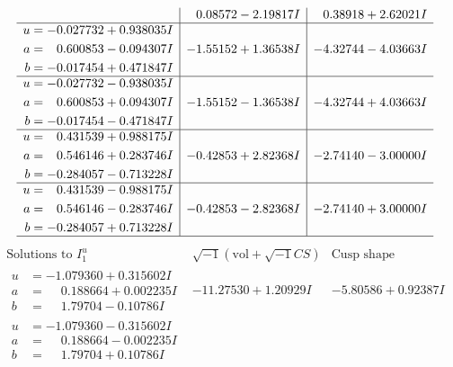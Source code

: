 \documentclass[1p]{elsarticle_modified}
\theoremstyle{definition}
\newcommand{\I}{\sqrt{-1}}
\begin{document}
$$\begin{array}{c|c|c}
 & \phantom{-}0.08572 - 2.19817 I & \phantom{-}0.38918 + 2.62021 I \\ \hline\begin{aligned}
u &= -0.027732 + 0.938035 I \\
a &= \phantom{-}0.600853 - 0.094307 I \\
b &= -0.017454 + 0.471847 I\end{aligned}
 & -1.55152 + 1.36538 I & -4.32744 - 4.03663 I \\ \hline\begin{aligned}
u &= -0.027732 - 0.938035 I \\
a &= \phantom{-}0.600853 + 0.094307 I \\
b &= -0.017454 - 0.471847 I\end{aligned}
 & -1.55152 - 1.36538 I & -4.32744 + 4.03663 I \\ \hline\begin{aligned}
u &= \phantom{-}0.431539 + 0.988175 I \\
a &= \phantom{-}0.546146 + 0.283746 I \\
b &= -0.284057 - 0.713228 I\end{aligned}
 & -0.42853 + 2.82368 I & -2.74140 - 3.00000 I \\ \hline\begin{aligned}
u &= \phantom{-}0.431539 - 0.988175 I \\
a &= \phantom{-}0.546146 - 0.283746 I \\
b &= -0.284057 + 0.713228 I\end{aligned}
 & -0.42853 - 2.82368 I & -2.74140 + 3.00000 I\\
 \hline 
 \end{array}$$\newpage$$\begin{array}{c|c|c}  
\text{Solutions to }I^u_{1}& \I (\text{vol} + \sqrt{-1}CS) & \text{Cusp shape}\\
 \hline 
\begin{aligned}
u &= -1.079360 + 0.315602 I \\
a &= \phantom{-}0.188664 + 0.002235 I \\
b &= \phantom{-}1.79704 - 0.10786 I\end{aligned}
 & -11.27530 + 1.20929 I & -5.80586 + 0.92387 I \\ \hline\begin{aligned}
u &= -1.079360 - 0.315602 I \\
a &= \phantom{-}0.188664 - 0.002235 I \\
b &= \phantom{-}1.79704 + 0.10786 I\end{aligned}

\end{array}$$
\end{document}
